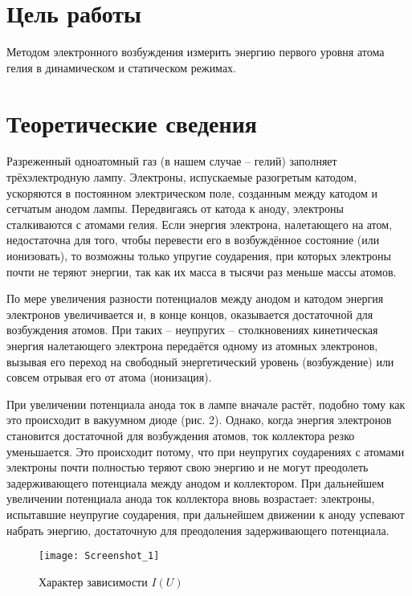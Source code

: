 


    

    \section*{Цель работы}
    Методом электронного возбуждения измерить энергию первого уровня атома гелия в динамическом и статическом режимах.

    \section*{Теоретические сведения}

    Разреженный одноатомный газ (в нашем случае -- гелий) заполняет трёхэлектродную лампу. Электроны, испускаемые разогретым катодом, ускоряются в постоянном электрическом поле, созданным между катодом и сетчатым анодом лампы. Передвигаясь от катода к аноду, электроны сталкиваются с атомами гелия. Если энергия электрона, налетающего на атом, недостаточна для того, чтобы перевести его в возбуждённое состояние (или ионизовать), то возможны только упругие соударения, при которых электроны почти не теряют энергии, так как их масса в тысячи раз меньше массы атомов.


    По мере увеличения разности потенциалов между анодом и катодом энергия электронов увеличивается и, в конце концов, оказывается достаточной для возбуждения атомов. При таких -- неупругих -- столкновениях кинетическая энергия налетающего электрона передаётся одному из атомных электронов, вызывая его переход на свободный энергетический уровень (возбуждение) или совсем отрывая его от атома (ионизация).

    При увеличении потенциала анода ток в лампе вначале растёт, подобно тому как это происходит в вакуумном диоде (рис. 2). Однако, когда энергия электронов становится достаточной для возбуждения атомов, ток коллектора резко уменьшается. Это происходит потому, что при неупругих соударениях с атомами электроны почти полностью теряют свою энергию и не могут преодолеть задерживающего потенциала между анодом и коллектором. При дальнейшем увеличении потенциала анода ток коллектора вновь возрастает: электроны, испытавшие неупругие соударения, при дальнейшем движении к аноду успевают набрать энергию, достаточную для преодоления задерживающего потенциала.


    \begin{figure}[h!]
        \centering
        \texttt{[image: Screenshot\_1]}
        \caption{Характер зависимости $I (U)$}
        \label{fig:screenshot1}
    \end{figure}

